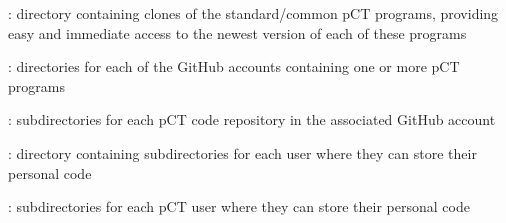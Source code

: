 \begin{tcbenvironment}
\begin{tcbenumbox}
\begin{ThinEnum}[labelindent=1pt, leftmargin=*]
\begin{ThinEnum}[labelindent=1pt, leftmargin=*]
            \begin{ThinEnum}[labelindent=1pt, leftmargin=*]
                \item {} : directory containing clones of the standard/common pCT programs, providing easy and immediate access to the newest version of each of these programs
                \begin{ThinEnum}[labelindent=1pt, leftmargin=*]
                    \item {} : directories for each of the GitHub accounts containing one or more pCT programs
                	\begin{ThinEnum}[labelindent=1pt, leftmargin=*]
                        \item {} : subdirectories for each pCT code repository in the associated GitHub account
                    \end{ThinEnum}
                \end{ThinEnum}
            \item {} : directory containing subdirectories for each user where they can store their personal code
                \begin{ThinEnum}[labelindent=1pt, leftmargin=*]
                    \item {} : subdirectories for each pCT user where they can store their personal code
                \end{ThinEnum}
        \end{ThinEnum}
        \end{ThinEnum}
\end{ThinEnum}
\end{tcbenumbox}
\end{tcbenvironment}
\endinput
